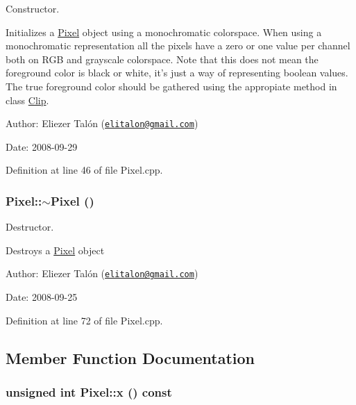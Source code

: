 Constructor. 

Initializes a \hyperlink{class_pixel}{Pixel} object using a monochromatic colorspace. When using a monochromatic representation all the pixels have a zero or one value per channel both on RGB and grayscale colorspace. Note that this does not mean the foreground color is black or white, it's just a way of representing boolean values. The true foreground color should be gathered using the appropiate method in class \hyperlink{class_clip}{Clip}.

\begin{Desc}
\item[Author:]Eliezer Talón (\href{mailto:elitalon@gmail.com}{\tt elitalon@gmail.com}) \end{Desc}
\begin{Desc}
\item[Date:]2008-09-29 \end{Desc}


Definition at line 46 of file Pixel.cpp.\hypertarget{class_pixel_30f6aaf9a1d8792245070860546fa365}{
\subsubsection[$\sim$Pixel]{\setlength{\rightskip}{0pt plus 5cm}Pixel::$\sim$Pixel ()}}
\label{class_pixel_30f6aaf9a1d8792245070860546fa365}


Destructor. 

Destroys a \hyperlink{class_pixel}{Pixel} object

\begin{Desc}
\item[Author:]Eliezer Talón (\href{mailto:elitalon@gmail.com}{\tt elitalon@gmail.com}) \end{Desc}
\begin{Desc}
\item[Date:]2008-09-25 \end{Desc}


Definition at line 72 of file Pixel.cpp.

\subsection{Member Function Documentation}
\hypertarget{class_pixel_68dafccc4588fb33d445641c2766316b}{
\subsubsection[x]{\setlength{\rightskip}{0pt plus 5cm}unsigned int Pixel::x () const}}
\label{class_pixel_68dafccc4588fb33d445641c2766316b}


